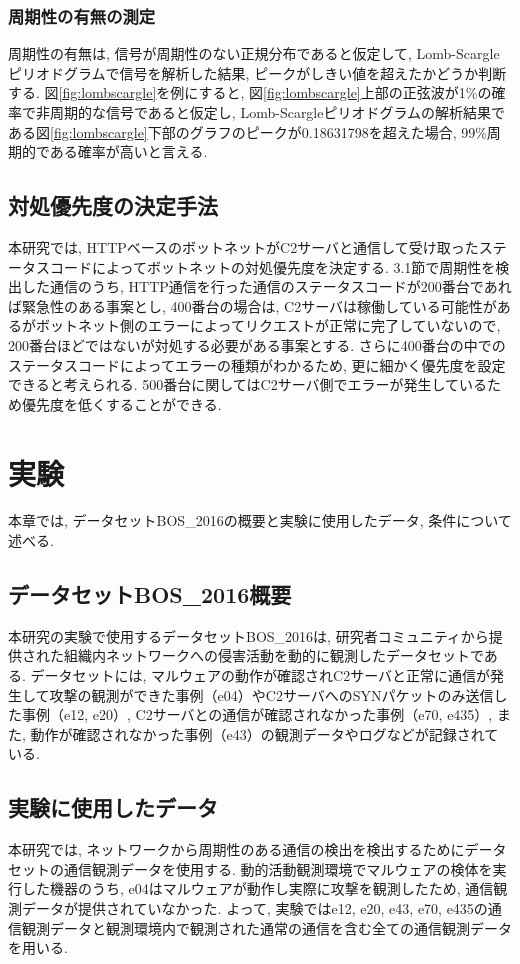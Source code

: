 \documentclass[twocolumn,9pt]{ltjsarticle}
\begin{document}
\subsubsection{周期性の有無の測定}
周期性の有無は, 信号が周期性のない正規分布であると仮定して, Lomb-Scargleピリオドグラムで信号を解析した結果, ピークがしきい値を超えたかどうか判断する. 図\ref{fig:lombscargle}を例にすると, 図\ref{fig:lombscargle}上部の正弦波が1\%の確率で非周期的な信号であると仮定し, Lomb-Scargleピリオドグラムの解析結果である図\ref{fig:lombscargle}下部のグラフのピークが0.18631798を超えた場合, 99\%周期的である確率が高いと言える. 

\subsection{対処優先度の決定手法}
本研究では, HTTPベースのボットネットがC2サーバと通信して受け取ったステータスコードによってボットネットの対処優先度を決定する. 3.1節で周期性を検出した通信のうち, HTTP通信を行った通信のステータスコードが200番台であれば緊急性のある事案とし, 400番台の場合は, C2サーバは稼働している可能性があるがボットネット側のエラーによってリクエストが正常に完了していないので, 200番台ほどではないが対処する必要がある事案とする. さらに400番台の中でのステータスコードによってエラーの種類がわかるため, 更に細かく優先度を設定できると考えられる. 500番台に関してはC2サーバ側でエラーが発生しているため優先度を低くすることができる. 

\section{実験}
本章では, データセットBOS\_2016の概要と実験に使用したデータ, 条件について述べる. 

\subsection{データセットBOS\_2016概要}
本研究の実験で使用するデータセットBOS\_2016は, 研究者コミュニティから提供された組織内ネットワークへの侵害活動を動的に観測したデータセットである. データセットには, マルウェアの動作が確認されC2サーバと正常に通信が発生して攻撃の観測ができた事例（e04）やC2サーバへのSYNパケットのみ送信した事例（e12, e20）, C2サーバとの通信が確認されなかった事例（e70, e435）, また, 動作が確認されなかった事例（e43）の観測データやログなどが記録されている. 

\subsection{実験に使用したデータ}
本研究では, ネットワークから周期性のある通信の検出を検出するためにデータセットの通信観測データを使用する. 動的活動観測環境でマルウェアの検体を実行した機器のうち, e04はマルウェアが動作し実際に攻撃を観測したため, 通信観測データが提供されていなかった. よって, 実験ではe12, e20, e43, e70, e435の通信観測データと観測環境内で観測された通常の通信を含む全ての通信観測データを用いる. 
\end{document}

